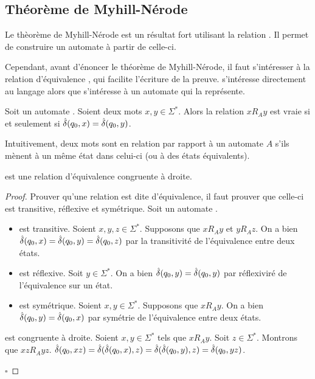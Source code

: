 \subsection{Théorème de Myhill-Nérode}\label{angluin:nerode}



	Le thèorème de Myhill-Nérode est un résultat fort utilisant la relation \rl. Il permet de construire un automate à partir de celle-ci.

	Cependant, avant d'énoncer le théorème de Myhill-Nérode, il faut s'intéresser à la relation d'équivalence \ra, qui facilite l'écriture de la preuve. \rl s'intéresse directement au langage alors que \ra s'intéresse à un automate qui la représente.

	\begin{definition}[Relation \ra]
		Soit un automate \automaton. Soient deux mots $x,y\in\Sigma^*$. Alors la relation $xR_Ay$ est vraie si et seulement si $\hat{\delta}(q_0,x)=\hat{\delta}(q_0,y)$.
	\end{definition}

	Intuitivement, deux mots sont en relation \ra par rapport à un automate $A$ s'ils mènent à un même état dans celui-ci (ou à des états équivalents).

	\begin{lemma}
		\ra est une relation d'équivalence congruente à droite.
	\end{lemma}

	\begin{proof}
		Prouver qu'une relation est dite d'équivalence, il faut prouver que celle-ci est transitive, réflexive et symétrique.
		Soit un automate \automaton.
		\begin{itemize}
		\item \ra est transitive. Soient $x,y,z\in\Sigma^*$. Supposons que $xR_Ay$ et $yR_Az$. On a bien $\hat{\delta}(q_0,x)=\hat{\delta}(q_0,y)=\hat{\delta}(q_0,z)$ par la transitivité de l'équivalence entre deux états.
		\item \ra est réflexive. Soit $y\in\Sigma^*$. On a bien $\hat{\delta}(q_0,y)=\hat{\delta}(q_0,y)$ par réflexiviré de l'équivalence sur un état.
		\item \ra est symétrique. Soient $x,y\in\Sigma^*$. Supposons que $xR_Ay$. On a bien $\hat{\delta}(q_0,y)=\hat{\delta}(q_0,x)$ par symétrie de l'équivalence entre deux états.
		\end{itemize}

		\ra est congruente à droite. Soient $x,y\in\Sigma^*$ tels que $xR_Ay$. Soit $z\in\Sigma^*$. Montrons que $xzR_Ayz$. $\hat{\delta}(q_0,xz)=\hat{\delta}(\hat{\delta}(q_0,x),z)=\hat{\delta}(\hat{\delta}(q_0,y),z)=\hat{\delta}(q_0,yz)$.

		\hfill$\square$
	\end{proof}

